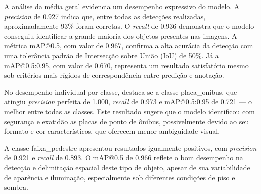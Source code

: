 \begin{table}[htbp]
\centering
\caption{Métricas de desempenho do modelo \texttt{yolo11m.pt} (best.pt) no conjunto de validação}
\label{tab:metricas-yolov11m}
\end{table}

A análise da média geral evidencia um desempenho expressivo do modelo. A \textit{precision} de 0.927 indica que, entre todas as detecções realizadas, aproximadamente 93\% foram corretas. O \textit{recall} de 0.936 demonstra que o modelo conseguiu identificar a grande maioria dos objetos presentes nas imagens. A métrica mAP@0.5, com valor de 0.967, confirma a alta acurácia da detecção com uma tolerância padrão de Intersecção sobre União (IoU) de 50\%. Já a mAP@0.5:0.95, com valor de 0.670, representa um resultado satisfatório mesmo sob critérios mais rígidos de correspondência entre predição e anotação.


No desempenho individual por classe, destaca-se a classe placa\_onibus, que atingiu \textit{precision} perfeita de 1.000, \textit{recall} de 0.973 e mAP@0.5:0.95 de 0.721 — o melhor entre todas as classes. Este resultado sugere que o modelo identificou com segurança e exatidão as placas de ponto de ônibus, possivelmente devido ao seu formato e cor característicos, que oferecem menor ambiguidade visual.

A classe faixa\_pedestre apresentou resultados igualmente positivos, com \textit{precision} de 0.921 e \textit{recall} de 0.893. O mAP@0.5 de 0.966 reflete o bom desempenho na detecção e delimitação espacial deste tipo de objeto, apesar de sua variabilidade de aparência e iluminação, especialmente sob diferentes condições de piso e sombra.

